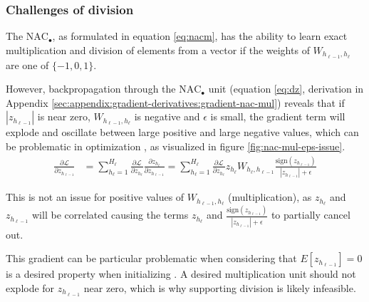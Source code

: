 \subsubsection{Challenges of division} \label{sssec:nac-mul}

The $\text{NAC}_{\bullet}$, as formulated in equation \ref{eq:nacm}, has the ability to learn exact multiplication and division of elements from a vector if the weights of $W_{h_{\ell-1},h_\ell}$ are one of $\{-1, 0, 1\}$.

However, backpropagation through the $\text{NAC}_{\bullet}$ unit (equation \ref{eq:dz}, derivation in Appendix \ref{sec:appendix:gradient-derivatives:gradient-nac-mul}) reveals that if $|z_{h_{\ell-1}}|$ is near zero, $W_{h_{\ell-1},h_\ell}$ is negative and $\epsilon$ is small, the gradient term will explode and oscillate between large positive and large negative values, which can be problematic in optimization \cite{adam-optimization}, as visualized in figure \ref{fig:nac-mul-eps-issue}.
\begin{align}
\frac{\partial \mathcal{L}}{\partial z_{h_{\ell-1}}} &= \sum_{h_\ell = 1}^{H_\ell} \frac{\partial \mathcal{L}}{\partial z_{h_\ell}} \frac{\partial z_{h_\ell}}{\partial z_{h_{\ell-1}}} = \sum_{h_\ell = 1}^{H_\ell} \frac{\partial \mathcal{L}}{\partial z_{h_\ell}} z_{h_\ell} W_{h_\ell, h_{\ell-1}} \frac{\mathrm{sign}(z_{h_{\ell-1}})}{|z_{h_{\ell-1}}| + \epsilon}\label{eq:dz}
\end{align}

This is not an issue for positive values of $W_{h_{\ell-1},h_\ell}$ (multiplication), as $z_{h_{\ell}}$ and $z_{h_{\ell-1}}$ will be correlated causing the terms $z_{h_\ell}$ and $\frac{\mathrm{sign}(z_{h_{\ell-1}})}{|z_{h_{\ell-1}}| + \epsilon}$ to partially cancel out.

This gradient can be particular problematic when considering that $E[z_{h_{\ell-1}}] = 0$ is a desired property when initializing \cite{glorot-initialization}.
A desired multiplication unit should not explode for $z_{h_{\ell-1}}$ near zero, which is why supporting division is likely infeasible.

